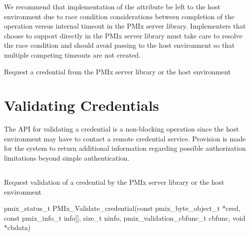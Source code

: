 
\optattrend

\adviceimplstart
We recommend that implementation of the  attribute be left to the host environment due to race condition considerations between completion of the operation versus internal timeout in the \ac{PMIx} server library. Implementers that choose to support  directly in the \ac{PMIx} server library must take care to resolve the race condition and should avoid passing  to the host environment so that multiple competing timeouts are not created.
\adviceimplend

\descr

Request a credential from the \ac{PMIx} server library or the host environment

\section{Validating Credentials}
\label{chap:api_security:validate}

The \ac{API} for validating a credential is a non-blocking operation since the host environment may have to contact a remote credential service. Provision is made for the system to return additional information regarding possible authorization limitations beyond simple authentication.

\subsection{}

\summary

Request validation of a credential by the \ac{PMIx} server library or the host environment

\format

\cspecificstart
\begin{codepar}
pmix_status_t
PMIx_Validate_credential(const pmix_byte_object_t *cred,
                         const pmix_info_t info[], size_t ninfo,
                         pmix_validation_cbfunc_t cbfunc,
                         void *cbdata)
\end{codepar}
\cspecificend

\begin{arglist}
\end{arglist}

